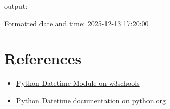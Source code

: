 \documentclass[11pt]{article}
\providecommand{\tightlist}{%
      \setlength{\itemsep}{0pt}\setlength{\parskip}{0pt}}
\newenvironment{Shaded}{}{}
\newcommand{\NormalTok}[1]{{#1}}
\begin{document}
output:

\begin{Shaded}
\begin{Highlighting}[]
\NormalTok{Formatted date and time:  2025{-}12{-}13 17:20:00}
\end{Highlighting}
\end{Shaded}

\section{References}

\begin{itemize}
\tightlist
\item
  \href{https://www.w3schools.com/python/python_datetime.asp}{Python Datetime Module on w3schools} 
\item
  \href{https://docs.python.org/3/library/datetime.html}{Python Datetime documentation on python.org} 
\end{itemize}


    
    
    
\end{document}
